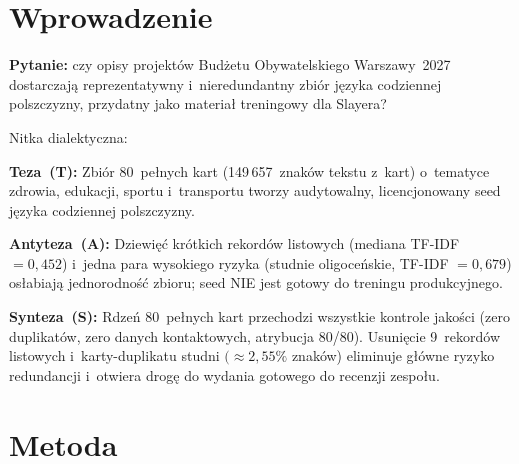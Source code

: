 
\begin{abstract}
\noindent
Budujemy seed datasetu języka współczesnej polszczyzny z opisów projektów
Budżetu Obywatelskiego Warszawy~2027 (licencja CC~BY-SA~4.0).
Aktualny stan: 89~rekordów, 152\,526~znaków, 9~kategorii, 16~dzielnic;
80~pełnych kart ze stabilnym \texttt{source\_url} i~kompletną atrybucją.
Analiza redundancji wykazała medianę podobieństwa TF-IDF $= 0{,}034$
w~rdzeniu pełnych kart --- poziom niski, porównywalny z~niezależnymi
dokumentami. Seed spełnia kryteria recenzji v0.1, lecz nie jest jeszcze
dojrzałym datassetem produkcyjnym.
\end{abstract}

\section{Wprowadzenie}

\textbf{Pytanie:} czy opisy projektów Budżetu Obywatelskiego Warszawy~2027
dostarczają reprezentatywny i~nieredundantny zbiór języka codziennej
polszczyzny, przydatny jako materiał treningowy dla Slayera?

\smallskip
\noindent
Nitka dialektyczna:

\medskip
\noindent
\textbf{Teza~(T):} Zbiór 80~pełnych kart (149\,657~znaków tekstu z~kart)
o~tematyce zdrowia, edukacji, sportu i~transportu tworzy audytowalny,
licencjonowany seed języka codziennej polszczyzny.

\medskip
\noindent
\textbf{Antyteza~(A):} Dziewięć krótkich rekordów listowych
(mediana TF-IDF $= 0{,}452$) i~jedna para wysokiego ryzyka
(studnie oligoceńskie, TF-IDF $= 0{,}679$) osłabiają jednorodność
zbioru; seed NIE jest gotowy do treningu produkcyjnego.

\medskip
\noindent
\textbf{Synteza~(S):} Rdzeń 80~pełnych kart przechodzi wszystkie
kontrole jakości (zero duplikatów, zero danych kontaktowych,
atrybucja 80/80). Usunięcie 9~rekordów listowych i~karty-duplikatu
studni $(\approx 2{,}55\%$ znaków) eliminuje główne ryzyko redundancji
i~otwiera drogę do wydania gotowego do recenzji zespołu.

\section{Metoda}

